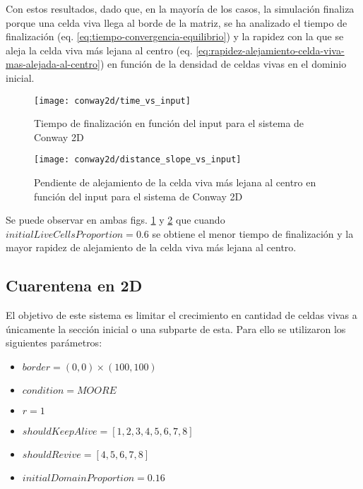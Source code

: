 Con estos resultados, dado que, en la mayoría de los casos, la simulación finaliza porque una celda viva llega al borde de la matriz,
se ha analizado el tiempo de finalización (eq. \ref{eq:tiempo-convergencia-equilibrio}) y la rapidez con la que se aleja la celda viva
más lejana al centro (eq. \ref{eq:rapidez-alejamiento-celda-viva-mas-alejada-al-centro}) en función de la densidad de celdas vivas en el dominio inicial.

\begin{figure}[H]
    \centering
    \texttt{[image: conway2d/time\_vs\_input]}
    \caption{Tiempo de finalización en función del input para el sistema de Conway 2D}
    \label{fig:conway2d_time_vs_input}
\end{figure}
\begin{figure}[H]
    \centering
    \texttt{[image: conway2d/distance\_slope\_vs\_input]}
    \caption{Pendiente de alejamiento de la celda viva más lejana al centro en función del input para el sistema de Conway 2D}
    \label{fig:conway2d_distance_slope_vs_input}
\end{figure}

Se puede observar en ambas figs. \ref{fig:conway2d_time_vs_input} y \ref{fig:conway2d_distance_slope_vs_input} que cuando
$initialLiveCellsProportion = 0.6$ se obtiene el menor tiempo de finalización y la mayor rapidez de alejamiento de la celda viva más lejana al centro.

\subsection{Cuarentena en 2D}\label{subsec:cuarentena-2D}

El objetivo de este sistema es limitar el crecimiento en cantidad de celdas vivas a únicamente la sección inicial o una subparte de esta. Para ello
se utilizaron los siguientes parámetros:

\begin{itemize}
    \item $border = (0, 0) \times (100, 100)$
    \item $condition = MOORE$
    \item $r = 1$
    \item $shouldKeepAlive = [1, 2, 3, 4, 5, 6, 7, 8]$
    \item $shouldRevive = [4, 5, 6, 7, 8]$
    \item $initialDomainProportion = 0.16$
\end{itemize}

